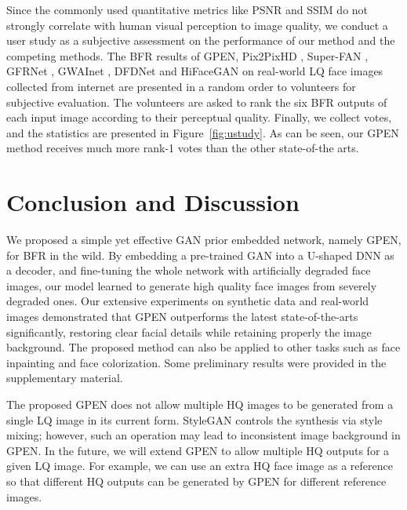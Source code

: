 \documentclass[final]{cvpr}
\begin{document}
Since the commonly used quantitative metrics like PSNR and SSIM do not strongly correlate with human visual perception to image quality, we conduct a user study as a subjective assessment on the performance of our method and the competing methods. The BFR results of GPEN, Pix2PixHD \cite{Wang2018Pix2PixHD}, Super-FAN \cite{Bulat2018SuperFAN}, GFRNet \cite{Li2018GFRNet}, GWAInet \cite{Dogan2019Exemplar}, DFDNet \cite{Li2020Restore} and HiFaceGAN \cite{Yang2020HiFaceGANFR} on  real-world LQ face images collected from internet are presented in a random order to  volunteers for subjective evaluation. The volunteers are asked to rank the six BFR outputs of each input image according to their perceptual quality. Finally, we collect  votes, and the statistics are presented in Figure~\ref{fig:ustudy}. As can be seen, our GPEN method receives much more rank-1 votes than the other state-of-the arts.



\section{Conclusion and Discussion}
We proposed a simple yet effective GAN prior embedded network, namely GPEN, for BFR in the wild. By embedding a pre-trained GAN into a U-shaped DNN as a decoder, and fine-tuning the whole network with artificially degraded face images, our model learned to generate high quality face images from severely degraded ones. Our extensive experiments on synthetic data and real-world images demonstrated that GPEN outperforms the latest state-of-the-arts significantly, restoring clear facial details while retaining properly the image background. The proposed method can also be applied to other tasks such as face inpainting and face colorization. Some preliminary results were provided in the supplementary material. 

The proposed GPEN does not allow multiple HQ images to be generated from a single LQ image in its current form. StyleGAN controls the synthesis via style mixing; however, such an operation may lead to inconsistent image background in GPEN. In the future, we will extend GPEN to allow multiple HQ outputs for a given LQ image. For example, we can use an extra HQ face image as a reference so that different HQ outputs can be generated by GPEN for different reference images. 







{\small


}
\end{document}
